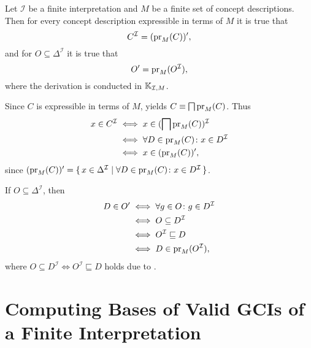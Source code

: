 \begin{Proposition}
  \label{prop:connection-I-prime-1}
  Let $\mathcal{I}$ be a finite interpretation and $M$ be a finite set of concept
  descriptions.  Then for every concept description expressible in terms of $M$ it is true
  that
  \begin{equation*}
    C^{\mathcal{I}} = (\operatorname{pr}_M(C))',
  \end{equation*}
  and for $O \subseteq \Delta^{\mathcal{I}}$ it is true that
  \begin{equation*}
    O' = \operatorname{pr}_M(O^{\mathcal{I}}),
  \end{equation*}
  where the derivation is conducted in ${\mathbb{K}}_{\mathcal{I}, M}$.
\end{Proposition}
\begin{Proof}
  Since $C$ is expressible in terms of $M$,
   yields $C \equiv \bigsqcap \operatorname{pr}_M(C)$.
  Thus
  \begin{align*}
    x \in C^{\mathcal{I}}
    & \iff x \in (\bigsqcap \operatorname{pr}_M(C))^{\mathcal{I}} \\
    & \iff \forall D \in \operatorname{pr}_M(C) \colon x \in D^{\mathcal{I}} \\
    & \iff x \in (\operatorname{pr}_M(C))',
  \end{align*}
  since $(\operatorname{pr}_M(C))' = {\{\, x \in \Delta^{\mathcal{I}} \mid \forall D \in \operatorname{pr}_M(C) \colon
    x \in D^{\mathcal{I}} \,\}}$.

  If $O \subseteq \Delta^{\mathcal{I}}$, then
  \begin{align*}
    D \in O'
    & \iff \forall g \in O \colon g \in D^{\mathcal{I}} \\
    & \iff O \subseteq D^{\mathcal{I}} \\
    & \iff O^{\mathcal{I}} \sqsubseteq D \\
    & \iff D \in \operatorname{pr}_M(O^{\mathcal{I}}),
  \end{align*}
  where $O \subseteq D^{\mathcal{I}} \iff O^{\mathcal{I}} \sqsubseteq D$ holds due to
  .
\end{Proof}

%
%

\section{Computing Bases of Valid GCIs of a Finite Interpretation}
\label{sec:base-all-valid}


